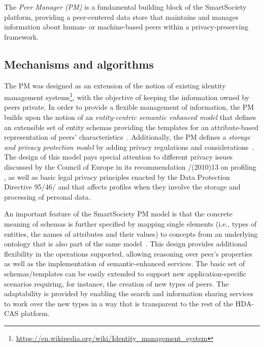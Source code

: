 The \emph{Peer Manager (PM)} is a fundamental building block of the SmartSociety platform, providing a peer-centered data store that maintains and manages information about human- or machine-based peers within a privacy-preserving framework. 

\subsection{Mechanisms and algorithms}

The PM was designed as an extension of the notion of existing identity management systems\footnote{\url{https://en.wikipedia.org/wiki/Identity_management_system}}, with the objective of keeping the information owned by peers private.
In order to provide a flexible management of information, the PM builds upon the notion of an \emph{entity-centric semantic enhanced model} that defines an extensible set of entity schemas providing the templates for an attribute-based representation of peers' characteristics~\cite{Giunchiglia_fromknowledge}. Additionally, the PM defines a \emph{storage and privacy protection model} by adding privacy regulations and considerations~\cite{Hartswood:2015fe}. 
The design of this model pays special attention to different privacy issues discussed by the Council of Europe in its recommendation {}/{}(2010)13 on profiling \cite{CoE2010}, as well as 
basic legal privacy principles enacted by the {} Data Protection Directive 95/46/{} \cite{EUDir95} and that affects profiles when they involve the storage and processing of personal data.

An important feature of the SmartSociety PM model is that the concrete meaning of schemas is further specified by mapping single elements (i.e., types of entities, the names of attributes and their values) to concepts from an underlying ontology that is also part of the same model~\cite{Giunchiglia_fromknowledge}. This design provides additional flexibility in the operations supported, allowing reasoning over peer's properties as well as the implementation of semantic-enhanced services.
%
The basic set of schemas/templates can be easily extended to support new application-specific scenarios requiring, for instance, the creation of new types of peers. The adaptability is provided by enabling the search and information sharing services to work over the new types in a way that is transparent to the rest of the HDA-CAS platform.

